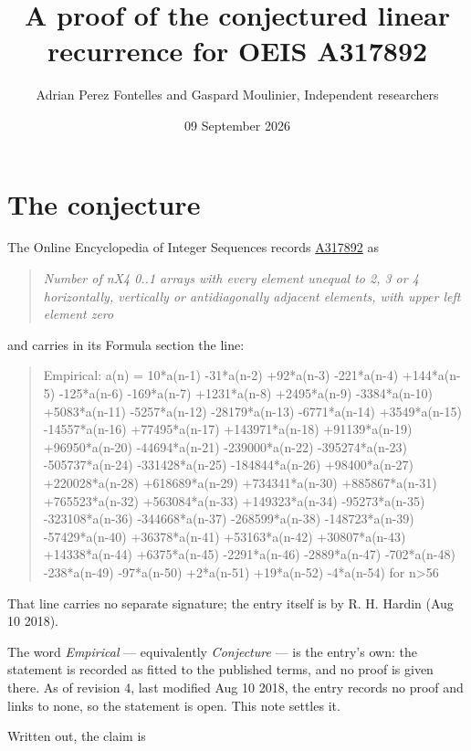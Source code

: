 \documentclass[11pt]{article}
\title{A proof of the conjectured linear recurrence for OEIS A317892}
\author{Adrian Perez Fontelles and Gaspard Moulinier, Independent researchers}
\date{09 September 2026}
\theoremstyle{definition}
\begin{document}
\maketitle
\section{The conjecture}

The Online Encyclopedia of Integer Sequences records \href{https://oeis.org/A317892}{A317892} as

\begin{quote}\itshape Number of nX4 0..1 arrays with every element unequal to 2, 3 or 4 horizontally, vertically or antidiagonally adjacent elements, with upper left element zero\end{quote}

and carries in its Formula section the line:

\begin{quote}\ttfamily Empirical: a(n) = 10*a(n-1) -31*a(n-2) +92*a(n-3) -221*a(n-4) +144*a(n-5) -125*a(n-6) -169*a(n-7) +1231*a(n-8) +2495*a(n-9) -3384*a(n-10) +5083*a(n-11) -5257*a(n-12) -28179*a(n-13) -6771*a(n-14) +3549*a(n-15) -14557*a(n-16) +77495*a(n-17) +143971*a(n-18) +91139*a(n-19) +96950*a(n-20) -44694*a(n-21) -239000*a(n-22) -395274*a(n-23) -505737*a(n-24) -331428*a(n-25) -184844*a(n-26) +98400*a(n-27) +220028*a(n-28) +618689*a(n-29) +734341*a(n-30) +885867*a(n-31) +765523*a(n-32) +563084*a(n-33) +149323*a(n-34) -95273*a(n-35) -323108*a(n-36) -344668*a(n-37) -268599*a(n-38) -148723*a(n-39) -57429*a(n-40) +36378*a(n-41) +53163*a(n-42) +30807*a(n-43) +14338*a(n-44) +6375*a(n-45) -2291*a(n-46) -2889*a(n-47) -702*a(n-48) -238*a(n-49) -97*a(n-50) +2*a(n-51) +19*a(n-52) -4*a(n-54) for n>56\end{quote}

That line carries no separate signature; the entry itself is by R. H. Hardin (Aug 10 2018).

The word {\itshape Empirical} --- equivalently {\itshape Conjecture} --- is the entry's own: the statement is recorded as fitted to the published terms, and no proof is given there. As of revision 4, last modified Aug 10 2018, the entry records no proof and links to none, so the statement is open. This note settles it.

Written out, the claim is
\end{document}

